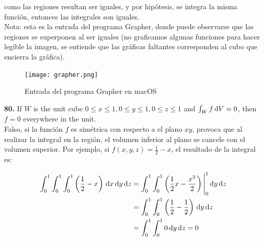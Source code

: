 \documentclass[11pt]{report}
\begin{document}
como las regiones resultan ser iguales, y por hipótesis, se integra la misma
función, entonces las integrales son iguales.\\

Nota: esta es la entrada del programa Grapher, donde puede observarse que
las regiones se superponen al ser iguales (no graficamos algunas funciones
para hacer legible la imagen, se entiende que las gráficas faltantes
corresponden al cubo que encierra la gráfica).

\begin{figure}[H]
	\texttt{[image: grapher.png]}
	\centering
	\caption{Entrada del programa Grapher en macOS}
	\centering
\end{figure}

\textbf{80.} If $W$ is the unit cube $0 \leq x \leq 1, 0 \leq y \leq 1, 0 \leq z \leq 1$
and $ \int _W f \, \text dV = 0$, then $f = 0$ everywhere in the unit. \\

Falso, si la función $f$ es simétrica con respecto a el plano $xy$, provoca que al
realizar la integral en la región, el volumen inferior al plano se cancele con el
volumen superior. Por ejemplo, si $f(x,y,z) = \frac{1}{2} - x$, el resultado
de la integral es:

\begin{align*}
        \int_0^1 \int_0^1 \int_0^1 \left( \frac{1}{2} - x \right) \, \text dx \, \text dy \, \text dz
        &= \int_0^1 \int_0^1 \left( \frac{1}{2}x - \frac{x^2}{2} \right) \Bigg|_0^1 \, \text dy \, \text dz \\ \notag
        &= \int_0^1 \int_0^1 \left( \frac{1}{2} - \frac{1}{2} \right) \, \text dy \, \text dz \\ \notag
        &= \int_0^1 \int_0^1 0 \, \text dy \, \text dz = 0 \\ \notag
\end{align*}
\end{document}

